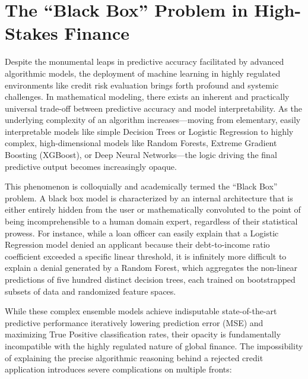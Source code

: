 \hypertarget{the-black-box-problem-in-high-stakes-finance}{%
\section{The ``Black Box'' Problem in High-Stakes
Finance}\label{the-black-box-problem-in-high-stakes-finance}}

Despite the monumental leaps in predictive accuracy facilitated by
advanced algorithmic models, the deployment of machine learning in
highly regulated environments like credit risk evaluation brings forth
profound and systemic challenges. In mathematical modeling, there exists
an inherent and practically universal trade-off between predictive
accuracy and model interpretability. As the underlying complexity of an
algorithm increases---moving from elementary, easily interpretable
models like simple Decision Trees or Logistic Regression to highly
complex, high-dimensional models like Random Forests, Extreme Gradient
Boosting (XGBoost), or Deep Neural Networks---the logic driving the
final predictive output becomes increasingly opaque.

This phenomenon is colloquially and academically termed the ``Black
Box'' problem. A black box model is characterized by an internal
architecture that is either entirely hidden from the user or
mathematically convoluted to the point of being incomprehensible to a
human domain expert, regardless of their statistical prowess. For
instance, while a loan officer can easily explain that a Logistic
Regression model denied an applicant because their debt-to-income ratio
coefficient exceeded a specific linear threshold, it is infinitely more
difficult to explain a denial generated by a Random Forest, which
aggregates the non-linear predictions of five hundred distinct decision
trees, each trained on bootstrapped subsets of data and randomized
feature spaces.

While these complex ensemble models achieve indisputable
state-of-the-art predictive performance iteratively lowering prediction
error (MSE) and maximizing True Positive classification rates, their
opacity is fundamentally incompatible with the highly regulated nature
of global finance. The impossibility of explaining the precise
algorithmic reasoning behind a rejected credit application introduces
severe complications on multiple fronts:

